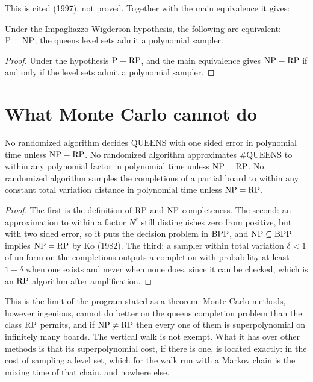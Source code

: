 This is cited \cite{IW} (1997), not proved. Together with the main equivalence it gives:

\begin{corollary}
Under the Impagliazzo Wigderson hypothesis, the following are equivalent: $\mathrm{P} = \mathrm{NP}$; the queens level sets admit a polynomial sampler.
\end{corollary}

\begin{proof}
Under the hypothesis $\mathrm{P} = \mathrm{RP}$, and the main equivalence gives $\mathrm{NP} = \mathrm{RP}$ if and only if the level sets admit a polynomial sampler.
\end{proof}

\section{What Monte Carlo cannot do}

\begin{theorem}
\label{thm:limitsmc}
No randomized algorithm decides $\mathrm{QUEENS}$ with one sided error in polynomial time unless $\mathrm{NP} = \mathrm{RP}$. No randomized algorithm approximates $\#\mathrm{QUEENS}$ to within any polynomial factor in polynomial time unless $\mathrm{NP} = \mathrm{RP}$. No randomized algorithm samples the completions of a partial board to within any constant total variation distance in polynomial time unless $\mathrm{NP} = \mathrm{RP}$.
\end{theorem}

\begin{proof}
The first is the definition of $\mathrm{RP}$ and $\mathrm{NP}$ completeness. The second: an approximation to within a factor $N^c$ still distinguishes zero from positive, but with two sided error, so it puts the decision problem in $\mathrm{BPP}$, and $\mathrm{NP} \subseteq \mathrm{BPP}$ implies $\mathrm{NP} = \mathrm{RP}$ by Ko \cite{Ko} (1982). The third: a sampler within total variation $\delta < 1$ of uniform on the completions outputs a completion with probability at least $1 - \delta$ when one exists and never when none does, since it can be checked, which is an $\mathrm{RP}$ algorithm after amplification.
\end{proof}

This is the limit of the program stated as a theorem. Monte Carlo methods, however ingenious, cannot do better on the queens completion problem than the class $\mathrm{RP}$ permits, and if $\mathrm{NP} \neq \mathrm{RP}$ then every one of them is superpolynomial on infinitely many boards. The vertical walk is not exempt. What it has over other methods is that its superpolynomial cost, if there is one, is located exactly: in the cost of sampling a level set, which for the walk run with a Markov chain is the mixing time of that chain, and nowhere else.

